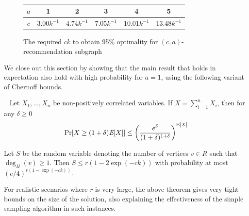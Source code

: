 \begin{figure}[H]
  \centering
  \begin{tabular}{ |c|c|c|c|c|c| }
    \hline
    $a$ & 1 & 2 & 3 & 4 & 5 \\ \hline
    $c$ & $3.00k^{-1}$ & $4.74k^{-1}$ & $7.05k^{-1}$ & $10.01k^{-1}$ & $13.48k^{-1}$ \\
    \hline
  \end{tabular}
  \caption{The required $ck$ to obtain 95\% optimality for $(c, a)$-recommendation subgraph}
  \label{a-values}
\end{figure}


We close out this section by showing that the main result that holds
in expectation also hold with high probability for $a=1$, using the
following variant of Chernoff bounds.

\begin{thm}\label{negative_corr_chernoff}~\cite{AugerDoerr2011}
Let $X_1,\ldots, X_n$ be non-positively correlated variables. If $X=\sum_{i=1}^n X_i$, then for any $\delta\geq 0$
\[ \Pr[X \geq (1+\delta)\emph{\text{E}}[X] ] \leq \left(\frac{e^\delta}{(1+\delta)^{1+\delta}}\right)^{\text{E}[X]} \]
\end{thm}


\begin{thm}
Let $S$ be the random variable denoting the number of vertices $v \in R$ such that $\deg_{H}(v)\geq 1$. Then
$ S \leq r(1-2\exp(-ck))$ with probability at most $(e/4)^{r(1-\exp(-ck))}$.
\end{thm}


For realistic scenarios where $r$ is very large, the above theorem gives very tight bounds on the size of the solution, also explaining the effectiveness of the simple sampling algorithm in such instances.
